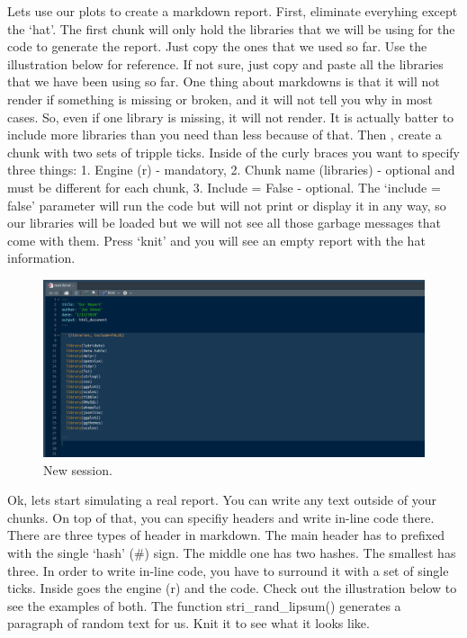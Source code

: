\documentclass[]{book}
\begin{document}
Lets use our plots to create a markdown report. First, eliminate everyhing except the `hat'. The first chunk will only hold the libraries that we will be using for the code to generate the report. Just copy the ones that we used so far. Use the illustration below for reference. If not sure, just copy and paste all the libraries that we have been using so far. One thing about markdowns is that it will not render if something is missing or broken, and it will not tell you why in most cases. So, even if one library is missing, it will not render. It is actually batter to include more libraries than you need than less because of that. Then , create a chunk with two sets of tripple ticks. Inside of the curly braces you want to specify three things: 1. Engine (r) - mandatory, 2. Chunk name (libraries) - optional and must be different for each chunk, 3. Include = False - optional. The `include = false' parameter will run the code but will not print or display it in any way, so our libraries will be loaded but we will not see all those garbage messages that come with them. Press `knit' and you will see an empty report with the hat information.

\begin{figure}
\centering
\includegraphics{markdown4.png}
\caption{New session.}
\end{figure}

Ok, lets start simulating a real report. You can write any text outside of your chunks. On top of that, you can specifiy headers and write in-line code there. There are three types of header in markdown. The main header has to prefixed with the single `hash' (\#) sign. The middle one has two hashes. The smallest has three. In order to write in-line code, you have to surround it with a set of single ticks. Inside goes the engine (r) and the code. Check out the illustration below to see the examples of both. The function stri\_rand\_lipsum() generates a paragraph of random text for us. Knit it to see what it looks like.
\end{document}
